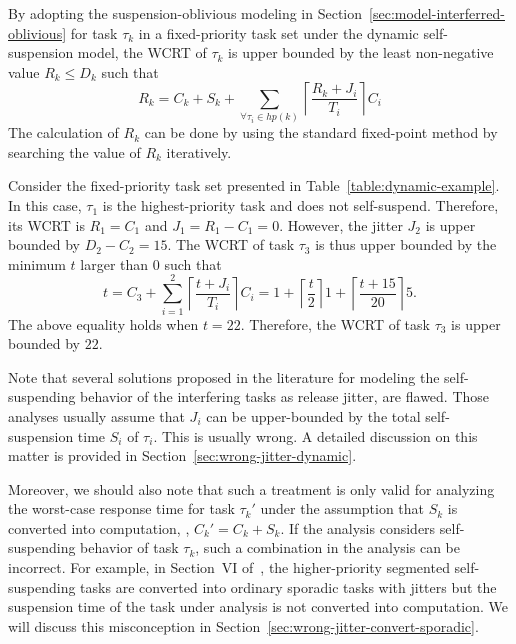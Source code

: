 By adopting the suspension-oblivious modeling in Section~\ref{sec:model-interferred-oblivious} for task $\tau_k$ in a fixed-priority task set under the dynamic self-suspension model, the WCRT of $\tau_k$ is upper bounded by the least non-negative value $R_k \leq D_k$ such that 
\begin{equation*}
R_k=C_k+S_k+ \sum_{\forall \tau_i \in hp(k)} \left\lceil \frac{R_k + J_i}{T_i} \right\rceil C_i
\end{equation*} 
The calculation of $R_k$ can be done by using the standard fixed-point method by searching the value of $R_k$ iteratively.

\begin{example}
\label{ex:suspension-jitter}    
Consider the fixed-priority task set presented in Table~\ref{table:dynamic-example}. In this case, $\tau_1$ is the highest-priority task and does not self-suspend. Therefore, its WCRT is $R_1 = C_1$ and $J_1 = R_1 - C_1 = 0$. However, the jitter $J_2$ is upper bounded by $D_2 - C_2 =15$. The WCRT of task $\tau_3$ is thus upper bounded by the minimum $t$ larger than $0$ such that 
$$t=C_3+ \sum_{i=1}^2\left\lceil \frac{t + J_i}{T_i} \right\rceil C_i = 1+\left\lceil \frac{t}{2} \right\rceil 1 +\left\lceil \frac{t+15}{20} \right\rceil 5.$$ 
The above equality holds when $t=22$. Therefore, the WCRT of task $\tau_{3}$ is upper bounded by $22$.
\hfill\myendproof  
\end{example}

Note that several solutions proposed in the literature \cite{ECRTS-AudsleyB04,RTAS-AudsleyB04,RTCSA-KimCPKH95} for modeling the 
self-suspending behavior of the interfering tasks as release jitter, are flawed. Those analyses usually assume that $J_i$ can be 
upper-bounded by the total self-suspension time $S_i$ of $\tau_i$. This is usually wrong. A detailed discussion on this matter is 
provided in Section~\ref{sec:wrong-jitter-dynamic}. 

Moreover, we should also note that such a treatment is only valid for
analyzing the worst-case response time for task $\tau_k'$ under the
assumption that $S_k$ is converted into computation, \ie, $C_k'=C_k+S_k$. If the analysis
considers self-suspending behavior of task $\tau_k$, such a
combination in the analysis can be incorrect. For example, in Section~VI of~\cite{ecrts15nelissen},
the higher-priority segmented self-suspending tasks are converted into ordinary sporadic tasks with jitters 
but the suspension time of the task under analysis is not converted into computation. 
We will discuss this misconception in Section~\ref{sec:wrong-jitter-convert-sporadic}.
 



